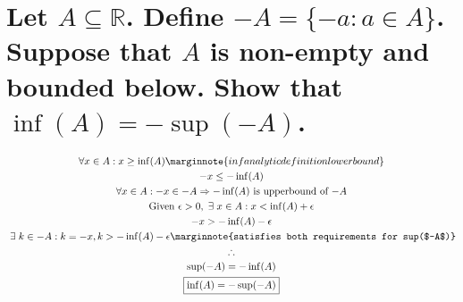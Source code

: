 \documentclass[letterpaper]{article}
\begin{document}
\section{Let $A \subseteq \mathbb{R}$. Define $-A=\{-a:a\in A\}$. Suppose that $A$ is non-empty and bounded below. Show that
$\inf(A)=-\sup(-A)$.}
\begin{gather*}
\forall x \in A: x \geq \inf(A) \marginnote{inf analytic definition lower bound} \\
-x\leq-\inf(A) \\
\forall x\in A: -x\in -A \Rightarrow -\inf(A) \text{ is upperbound of $-A$} \\ 
\text{Given } \epsilon>0,\hspace{3pt}\exists\hspace{3pt}x\in A:x<\inf(A)+\epsilon \\
-x > -\inf(A) - \epsilon \\
\hspace{3pt}\exists\hspace{3pt}k\in -A:k=-x,k>-\inf(A)-\epsilon \marginnote{satisfies both requirements for sup($-A$)} \\
\therefore \\
\sup(-A)=-\inf(A) \\
\boxed{\inf(A)=-\sup(-A)}
\end{gather*}
\end{document}

